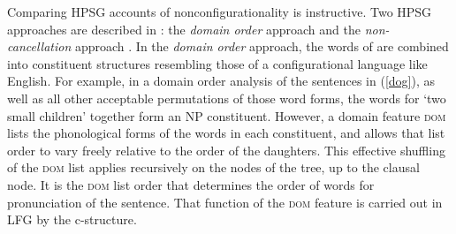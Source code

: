 
Comparing HPSG accounts of nonconfigurationality is instructive.   Two HPSG approaches are described in : the \emph{domain order} approach \citep{DS99a} and the \emph{non-cancellation} approach \citep{Bender2008a}. 
In the \emph{domain order}  approach, the words of  are combined into constituent structures resembling those of a configurational language like English.  For example, in a domain order analysis of the  sentences in (\ref{dog}), as well as all other acceptable permutations of those word forms, the words for `two small children' together form an NP constituent.  However, a domain feature \textsc{dom} lists the phonological forms of the words in each constituent, and allows that list order to vary freely relative to the order of the daughters.  This effective shuffling of the \textsc{dom} list applies recursively on the nodes of the tree, up to the clausal node.  It is the \textsc{dom} list order that determines the order of words for  pronunciation of the sentence.  That function of the \textsc{dom} feature is carried out in LFG by the c-structure.    

